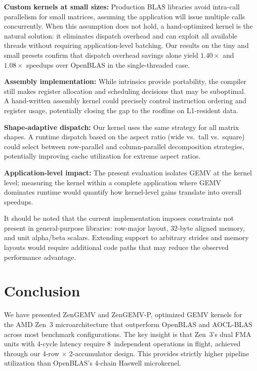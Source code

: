 \documentclass[conference]{IEEEtran}
\begin{document}
\textbf{Custom kernels at small sizes:} Production BLAS libraries avoid
intra-call parallelism for small matrices, assuming the application will issue
multiple calls concurrently. When this assumption does not hold, a hand-optimized
kernel is the natural solution: it eliminates dispatch overhead and can exploit
all available threads without requiring application-level batching. Our results
on the tiny and small presets confirm that dispatch overhead savings alone yield
$1.40\times$ and $1.08\times$ speedups over OpenBLAS in the single-threaded
case.

\textbf{Assembly implementation:} While intrinsics provide portability, the
compiler still makes register allocation and scheduling decisions that may be
suboptimal. A hand-written assembly kernel could precisely control instruction
ordering and register usage, potentially closing the gap to the roofline on
L1-resident data.

\textbf{Shape-adaptive dispatch:} Our kernel uses the same strategy for all
matrix shapes. A runtime dispatch based on the aspect ratio (wide vs.\ tall vs.\
square) could select between row-parallel and column-parallel decomposition
strategies, potentially improving cache utilization for extreme aspect ratios.

\textbf{Application-level impact:} The present evaluation isolates GEMV at the
kernel level; measuring the kernel within a complete application where GEMV
dominates runtime would quantify how kernel-level gains translate into overall
speedups.

It should be noted that the current implementation imposes constraints not present
in general-purpose libraries: row-major layout, 32-byte aligned memory, and unit
alpha/beta scalars. Extending support to arbitrary strides and memory layouts
would require additional code paths that may reduce the observed performance advantage.


\section{Conclusion}

We have presented ZenGEMV and ZenGEMV-P, optimized GEMV kernels for the AMD
Zen~3 microarchitecture that outperform OpenBLAS and AOCL-BLAS across most benchmark
configurations. The key insight is that Zen~3's dual FMA units with 4-cycle
latency require 8~independent operations in flight, achieved through our
4-row $\times$ 2-accumulator design. This provides strictly higher pipeline
utilization than OpenBLAS's 4-chain Haswell microkernel.
\end{document}
